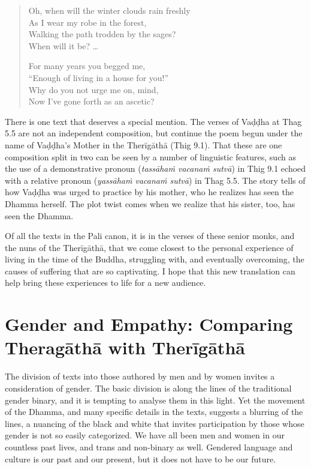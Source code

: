 \documentclass[12pt,openany]{book}%
\begin{document}
\begin{quotation}%
Oh, when will the winter clouds rain freshly \\
As I wear my robe in the forest, \\
Walking the path trodden by the sages? \\
When will it be? …

For many years you begged me, \\
“Enough of living in a house for you!” \\
Why do you not urge me on, mind, \\
Now I’ve gone forth as an ascetic?

%
\end{quotation}

There is one text that deserves a special mention. The verses of \textsanskrit{Vaḍḍha} at Thag 5.5 are not an independent composition, but continue the poem begun under the name of \textsanskrit{Vaḍḍha}’s Mother in the \textsanskrit{Therīgāthā} (Thig 9.1). That these are one composition split in two can be seen by a number of linguistic features, such as the use of a demonstrative pronoun (\textit{\textsanskrit{tassāhaṁ} \textsanskrit{vacanaṁ} \textsanskrit{sutvā}}) in Thig 9.1 echoed with a relative pronoun (\textit{\textsanskrit{yassāhaṁ} \textsanskrit{vacanaṁ} \textsanskrit{sutvā}}) in Thag 5.5. The story tells of how \textsanskrit{Vaḍḍha} was urged to practice by his mother, who he realizes has seen the Dhamma herself. The plot twist comes when we realize that his sister, too, has seen the Dhamma.

Of all the texts in the Pali canon, it is in the verses of these senior monks, and the nuns of the \textsanskrit{Therīgāthā}, that we come closest to the personal experience of living in the time of the Buddha, struggling with, and eventually overcoming, the causes of suffering that are so captivating. I hope that this new translation can help bring these experiences to life for a new audience.

\section*{Gender and Empathy: Comparing \textsanskrit{Theragāthā} with \textsanskrit{Therīgāthā}}

The division of texts into those authored by men and by women invites a consideration of gender. The basic division is along the lines of the traditional gender binary, and it is tempting to analyse them in this light. Yet the movement of the Dhamma, and many specific details in the texts, suggests a blurring of the lines, a nuancing of the black and white that invites participation by those whose gender is not so easily categorized. We have all been men and women in our countless past lives, and trans and non-binary as well. Gendered language and culture is our past and our present, but it does not have to be our future.
\end{document}
